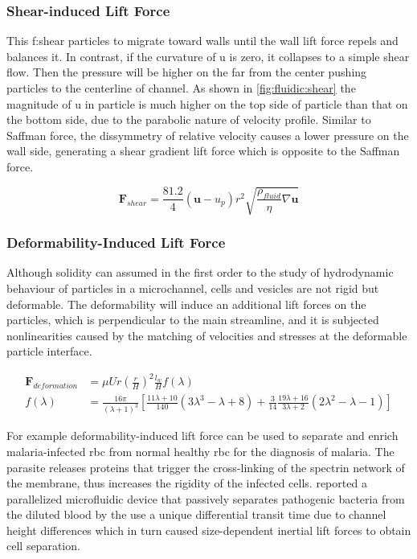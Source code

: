 \subsubsection{Shear-induced Lift Force}
This \gls{f:shear} particles to migrate toward walls until the wall lift force repels and balances it. In contrast, if the curvature of \gls{u} is zero, it collapses to a simple shear flow. Then the pressure will be higher on the far from the center pushing particles to the centerline of channel. As shown in \cref{fig:fluidic:shear} the magnitude of \gls{u} in particle is much higher on the top side of particle  than  that  on  the  bottom  side,  due  to  the parabolic nature of velocity profile. Similar  to  Saffman  force,  the  dissymmetry  of  relative  velocity  causes  a  lower  pressure  on the wall side, generating a shear gradient lift force which is opposite to the Saffman force.\cite{lit:fluidic:inertialFluidicsForces} 

\begin{equation}	
	\mathbf{F}_{shear} = \frac{81.2}{4} (\mathbf{u} - u_p) r^2 \sqrt{\frac{\rho_{fluid}}{\eta} \nabla \mathbf{u}} \label{eq:f:shear}
\end{equation}

\subsubsection{Deformability-Induced Lift Force}
Although solidity can assumed in the first order to the study of hydrodynamic behaviour of particles in a microchannel, cells and vesicles are not  rigid  but  deformable. The deformability  will  induce an additional  lift  forces on the particles, which is perpendicular to the main streamline, and it is subjected nonlinearities  caused  by  the matching   of   velocities   and   stresses   at   the   deformable   particle interface. 

\begin{align}
	\mathbf{F}_{deformation}&=\mu U r \left(\frac{r}{H}\right)^{2} \frac{l_w}{H} f\left(\lambda\right) \label{eq:f:deform}\\
	f(\lambda) &=\frac{16 \pi}{\left(\lambda+1\right)^{3}}\left[\frac{11 \lambda+10}{140}\left(3 \lambda^{3}-\lambda+8\right)+\frac{3}{14} \frac{19 \lambda+16}{3 \lambda+2}\left(2 \lambda^{2}-\lambda-1\right)\right] 
\end{align}

For example deformability-induced  lift  force  can  be  used  to  separate  and  enrich  malaria-infected \gls{rbc}  from  normal  healthy  \gls{rbc} for  the  diagnosis  of  malaria.  The parasite releases proteins that trigger the cross-linking of the spectrin network of the membrane, thus increases the rigidity of the infected cells.\cite{lit:fluid:deformability}
\citet{lit:fluid:deformabilityDiCarlo} reported a parallelized  microfluidic  device  that  passively separates pathogenic bacteria from the diluted blood by the use a unique differential transit time due to channel height differences which in turn caused size-dependent inertial  lift forces to obtain cell separation.

